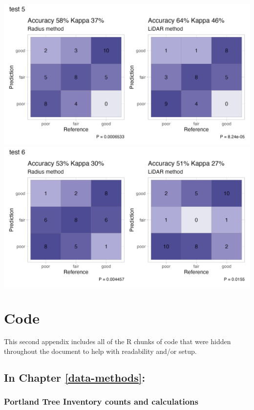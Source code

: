 \documentclass[12pt,twoside]{reedthesis}
\begin{document}
\includegraphics[width=0.85\linewidth]{figure/test5}
\includegraphics[width=0.85\linewidth]{figure/test6}

\hypertarget{code-chunks}{%
\chapter{Code}\label{code-chunks}}

This second appendix includes all of the R chunks of code that were hidden throughout the document to help with readability and/or setup.

\hypertarget{in-chapter-refdata-methods}{%
\section{\texorpdfstring{\textbf{In Chapter} \ref{data-methods}\textbf{:}}{In Chapter \ref{data-methods}:}}\label{in-chapter-refdata-methods}}

\hypertarget{portland-tree-inventory-counts-and-calculations}{%
\subsection*{Portland Tree Inventory counts and calculations}\label{portland-tree-inventory-counts-and-calculations}}
\end{document}
